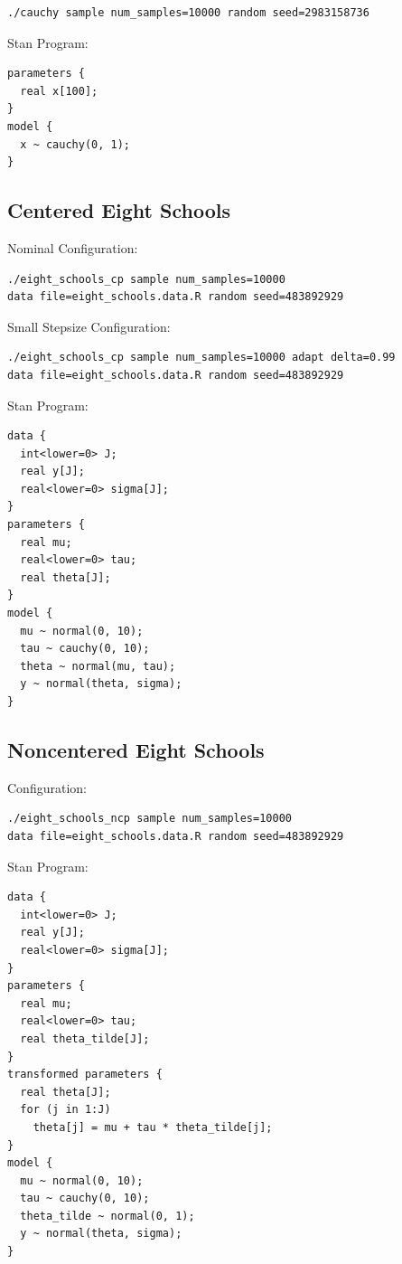 \documentclass[stslayout]{imsart}
\begin{document}
{\small
\begin{verbatim}
./cauchy sample num_samples=10000 random seed=2983158736
\end{verbatim}
}

\noindent Stan Program:

{\small
\begin{verbatim}
parameters {
  real x[100];
}
model {
  x ~ cauchy(0, 1);
}

\end{verbatim}
}

\subsection{Centered Eight Schools}

\noindent Nominal Configuration:

{\small
\begin{verbatim}
./eight_schools_cp sample num_samples=10000
data file=eight_schools.data.R random seed=483892929
\end{verbatim}
}

\noindent Small Stepsize Configuration:

{\small
\begin{verbatim}
./eight_schools_cp sample num_samples=10000 adapt delta=0.99
data file=eight_schools.data.R random seed=483892929
\end{verbatim}
}

\noindent Stan Program:

{\small
\begin{verbatim}
data {
  int<lower=0> J;
  real y[J];
  real<lower=0> sigma[J];
}
parameters {
  real mu;
  real<lower=0> tau;
  real theta[J];
}
model {
  mu ~ normal(0, 10);
  tau ~ cauchy(0, 10);
  theta ~ normal(mu, tau);
  y ~ normal(theta, sigma);
}
\end{verbatim}
}

\subsection{Noncentered Eight Schools}

\noindent Configuration:

{\small
\begin{verbatim}
./eight_schools_ncp sample num_samples=10000
data file=eight_schools.data.R random seed=483892929
\end{verbatim}
}

\noindent Stan Program:

{\small
\begin{verbatim}
data {
  int<lower=0> J;
  real y[J];
  real<lower=0> sigma[J];
}
parameters {
  real mu;
  real<lower=0> tau;
  real theta_tilde[J];
}
transformed parameters {
  real theta[J];
  for (j in 1:J)
    theta[j] = mu + tau * theta_tilde[j];
}
model {
  mu ~ normal(0, 10);
  tau ~ cauchy(0, 10);
  theta_tilde ~ normal(0, 1);
  y ~ normal(theta, sigma);
}
\end{verbatim}
}



\end{document}

